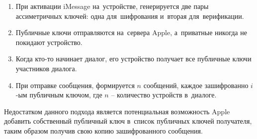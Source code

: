 \begin{enumerate}
	\item При активации iMessage на~устройстве, генерируется две пары ассиметричных ключей: одна для~шифрования и~вторая для~верификации.
	\item Публичные ключи отправляются на~сервера Apple, а~приватные никогда не покидают устройство.
	\item Когда кто-то начинает диалог, его устройство получает все публичные ключи участников диалога.
	\item При отправке сообщения, формируется \(n\) сообщений, каждое зашифрованно \(i\)-ым публичным ключом, где \(n\) -- количество устройств в~диалоге.
\end{enumerate}

Недостатком данного подхода является потенциальная возможность Apple добавить собственный публичный ключ в~список публичных ключей получателя, таким образом получив свою копию зашифрованного сообщения.
